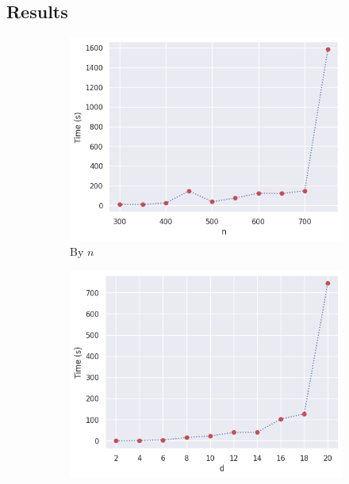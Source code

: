 \documentclass[11pt,twoside]{report}
\theoremstyle{definition}
\numberwithin{theorem}{section}
\numberwithin{definition}{section}
\numberwithin{lemma}{section}
\numberwithin{proposition}{section}
\numberwithin{equation}{section}
\numberwithin{figure}{section}
\begin{document}
\subsection{Results}
\begin{figure}
    \centering
    \begin{subfigure}[b]{0.475\textwidth}
        \centering
        \includegraphics[width=\textwidth]{exact_benchmarks/func_n_d10_eta0p9_normal.png}
        \caption{By $n$}
        \label{fig:exact_benchmarks_n}
    \end{subfigure}
    \hfill
    \begin{subfigure}[b]{0.475\textwidth}
        \centering
        \includegraphics[width=\textwidth]{exact_benchmarks/func_d_n300_eta0p9_normal.png}

\end{subfigure}
\end{figure}
\end{document}
